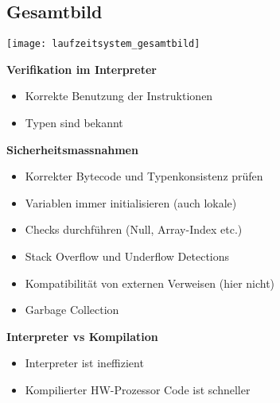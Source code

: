 \subsection{Gesamtbild}
\begin{minipage}{0.5\linewidth}
    \texttt{[image: laufzeitsystem\_gesamtbild]}
\end{minipage}
\begin{minipage}{0.5\linewidth}
    \textbf{Verifikation im Interpreter}
    \begin{itemize}[topsep=0pt]
        \itemsep -0.2em
        \item Korrekte Benutzung der Instruktionen
        \item Typen sind bekannt
    \end{itemize}
\end{minipage}

\textbf{Sicherheitsmassnahmen}
\begin{itemize}[topsep=0pt]
    \itemsep -0.2em
    \item Korrekter Bytecode und Typenkonsistenz prüfen
    \item Variablen immer initialisieren (auch lokale)
    \item Checks durchführen (Null, Array-Index etc.)
    \item Stack Overflow und Underflow Detections
    \item Kompatibilität von externen Verweisen (hier nicht)
    \item Garbage Collection
\end{itemize}

\textbf{Interpreter vs Kompilation}
\begin{itemize}[topsep=0pt]
    \itemsep -0.2em
    \item Interpreter ist ineffizient
    \item Kompilierter HW-Prozessor Code ist schneller
\end{itemize}